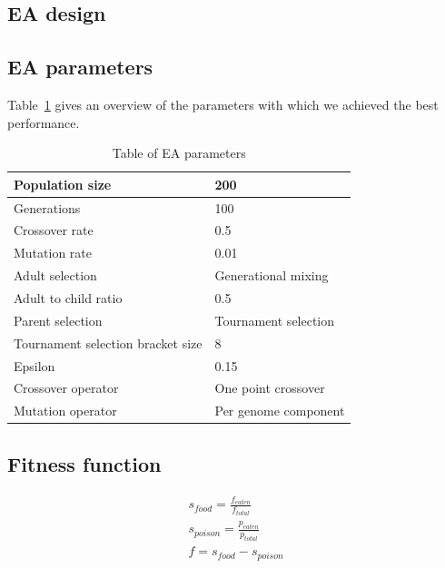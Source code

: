 \documentclass[twoside]{article}
\begin{document}
\begin{multicols}{2} %

  \section{EA design}

  \subsection{EA parameters}

  Table~\ref{tbl:ea-parameters} gives an overview of the parameters with which we achieved the best performance.

  \begin{table}[H]
    \begin{tabular}{|l|l|}
      \hline
      Population size                   & 200                  \\ \hline
      Generations                       & 100                  \\ \hline
      Crossover rate                    & 0.5                  \\ \hline
      Mutation rate                     & 0.01                 \\ \hline
      Adult selection                   & Generational mixing  \\ \hline
      Adult to child ratio              & 0.5                  \\ \hline
      Parent selection                  & Tournament selection \\ \hline
      Tournament selection bracket size & 8                    \\ \hline
      Epsilon                           & 0.15                 \\ \hline
      Crossover operator                & One point crossover  \\ \hline
      Mutation operator                 & Per genome component \\ \hline
    \end{tabular}
    \caption{Table of EA parameters}
    \label{tbl:ea-parameters}
  \end{table}

  \subsection{Fitness function}

  \begin{gather*}
    s_{food} = \frac{f_{eaten}}{f_{total}} \\[10pt]
    s_{poison} = \frac{p_{eaten}}{p_{total}} \\[10pt]
    f = s_{food} - s_{poison}
  \end{gather*}


\end{multicols}
\end{document}
